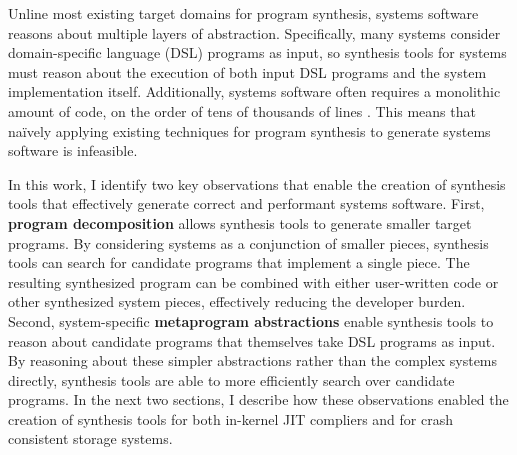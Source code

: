Unline most existing target domains for program synthesis, systems software reasons
about multiple layers of abstraction.
Specifically, many systems consider domain-specific language (DSL) programs as input,
so synthesis tools for systems must reason about the execution of both input DSL programs
and the system implementation itself.
Additionally, systems software
often requires a monolithic amount of code, on the order of tens of thousands
of lines .
This means that na\"ively applying existing techniques for program synthesis to generate
systems software is infeasible.

In this work, I identify two key observations that enable the creation of synthesis tools
that effectively generate correct and performant systems software.
First, \textbf{program decomposition} allows synthesis tools to generate smaller target programs.
By considering systems as a conjunction of smaller pieces,
synthesis tools can search for candidate programs that implement a single piece.
The resulting synthesized program can be combined with either user-written code or
other synthesized system pieces, effectively reducing the developer burden.
Second, system-specific \textbf{metaprogram abstractions} enable synthesis tools to reason 
about candidate programs that themselves take DSL programs as input.
By reasoning about these simpler abstractions rather than the complex systems directly,
synthesis tools are able to more efficiently search over candidate programs.
In the next two sections, I describe how these observations enabled the creation of
synthesis tools for both in-kernel JIT compliers and for crash consistent storage systems.

\fi


